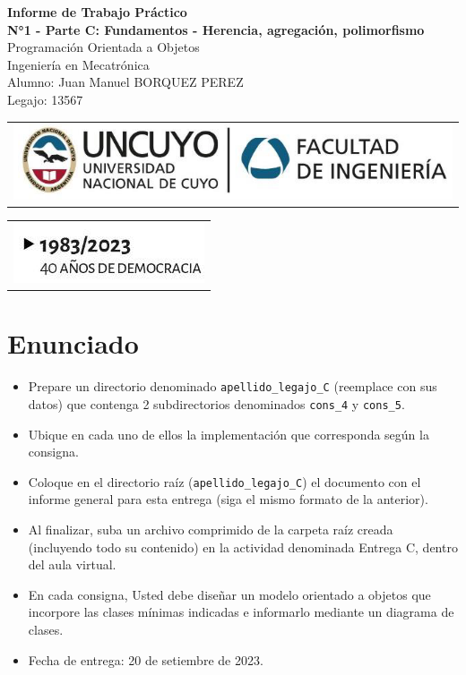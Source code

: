 \documentclass[a4paper,12pt]{article}
\begin{document}
\begin{titlepage}
    \centering
    \vspace*{5cm}
    {\Huge\bfseries Informe de Trabajo Práctico}\\
    \vspace{0.2cm}
    {\Large \textbf{N°1 - Parte C: Fundamentos -  Herencia, agregación, polimorfismo }}\\
    \vspace{0.5cm}
    {\Large Programación Orientada a Objetos}\\
    \vspace{0.2 cm}
    {\Large Ingeniería en Mecatrónica}\\
    \vspace{1.5cm}
    Alumno: Juan Manuel BORQUEZ PEREZ\\
    Legajo: 13567\\
    \vfill
    {\begin{tabular}{@{}c@{}}\includegraphics[scale=0.4]{escudo.PNG}\end{tabular}}\hspace{10pt}
    {\begin{tabular}{@{}c@{}}\includegraphics[scale=0.6]{año.PNG}\end{tabular}}
\end{titlepage}
\section{Enunciado}
\begin{itemize}
    \item[a)] Prepare un directorio denominado \texttt{apellido\_legajo\_C} (reemplace con sus datos) que contenga 2 subdirectorios denominados \texttt{cons\_4} y \texttt{cons\_5}.
    \item[b)] Ubique en cada uno de ellos la implementación que corresponda según la consigna.
    \item[c)] Coloque en el directorio raíz (\texttt{apellido\_legajo\_C}) el documento con el informe general para esta entrega (siga el mismo formato de la anterior).
    \item[d)] Al finalizar, suba un archivo comprimido de la carpeta raíz creada (incluyendo todo su contenido) en la actividad denominada Entrega C, dentro del aula virtual.
    \item[e)] En cada consigna, Usted debe diseñar un modelo orientado a objetos que incorpore las clases mínimas indicadas e informarlo mediante un diagrama de clases.
    \item[f)] Fecha de entrega: 20 de setiembre de 2023.
\end{itemize}
\end{document}
